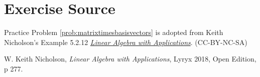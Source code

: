 \documentclass{ximera}
\begin{document}



\section*{Exercise Source}
Practice Problem \ref{prob:matrixtimesbasisvectors} is adopted from Keith Nicholson's Example 5.2.12  \href{https://open.umn.edu/opentextbooks/textbooks/linear-algebra-with-applications}{\it Linear Algebra with Applications}. (CC-BY-NC-SA)

W. Keith Nicholson, {\it Linear Algebra with Applications}, Lyryx 2018, Open Edition, p 277.
\end{document}
